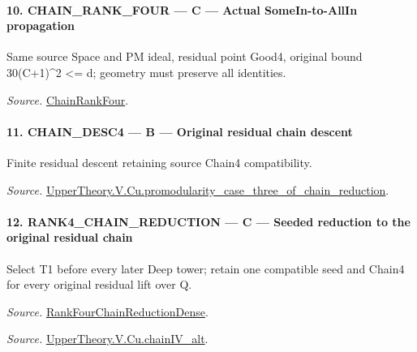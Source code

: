 \paragraph{10. CHAIN\_\allowbreak RANK\_\allowbreak FOUR — C — Actual SomeIn-to-AllIn propagation}

Same source Space and PM ideal, residual point Good4, original bound 30(C+1)\textasciicircum{}2 <= d; geometry must preserve all identities.

\emph{Source.} \href{https://github.com/CocoSgt/riemann-hypothesis-lean/blob/7cbf7a0c32fca1badf05931879a37c3f8a2b03b4/src/Development/AutomorphicArithmetic/AutomorphicVarieties/ModularityArgument/ThresholdArguments/DenseThresholdCases/PromodularityCaseThree.lean#L26-L32}{ChainRankFour}.



\paragraph{11. CHAIN\_\allowbreak DESC4 — B — Original residual chain descent}

Finite residual descent retaining source Chain4 compatibility.

\emph{Source.} \href{https://github.com/CocoSgt/riemann-hypothesis-lean/blob/7cbf7a0c32fca1badf05931879a37c3f8a2b03b4/src/Development/AutomorphicArithmetic/AutomorphicVarieties/ModularityArgument/ThresholdArguments/DenseThresholdCases/PromodularityCaseThreeOfLemmas.lean#L131-L153}{UpperTheory.V.Cu.promodularity\_\allowbreak case\_\allowbreak three\_\allowbreak of\_\allowbreak chain\_\allowbreak reduction}.



\paragraph{12. RANK4\_\allowbreak CHAIN\_\allowbreak REDUCTION — C — Seeded reduction to the original residual chain}

Select T1 before every later Deep tower; retain one compatible seed and Chain4 for every original residual lift over Q.

\emph{Source.} \href{https://github.com/CocoSgt/riemann-hypothesis-lean/blob/7cbf7a0c32fca1badf05931879a37c3f8a2b03b4/src/Development/AutomorphicArithmetic/AutomorphicVarieties/ModularityArgument/ThresholdArguments/DenseThresholdCases/PromodularityCaseThree.lean#L33-L39}{RankFourChainReductionDense}.

\emph{Source.} \href{https://github.com/CocoSgt/riemann-hypothesis-lean/blob/7cbf7a0c32fca1badf05931879a37c3f8a2b03b4/src/Development/AutomorphicArithmetic/AutomorphicVarieties/ModularityArgument/ThresholdArguments/DenseThresholdCases/CuPChainIV.lean#L16-L82}{UpperTheory.V.Cu.chainIV\_\allowbreak alt}.



